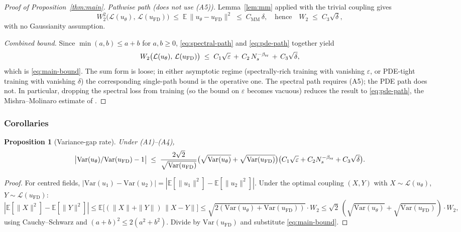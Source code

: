 \documentclass[review,12pt]{elsarticle}
\newtheorem{proposition}{Proposition}
\begin{document}
\begin{proof}[Proof of Proposition~\ref{thm:main}]
\smallskip
\emph{Pathwise path (does not use (A5)).} Lemma~\ref{lem:mm} applied
with the trivial coupling gives
\[
W_2^2\bigl(\mathcal L(u_\theta),\,\mathcal L(u_{\mathrm{FD}})\bigr)
\;\le\; \mathbb E\,\|u_\theta - u_{\mathrm{FD}}\|^2
\;\le\; C_{\mathrm{MM}}\,\delta,
\quad\text{hence}\quad
W_2 \;\le\; C_3\sqrt\delta,
\tag{$\dagger$}\label{eq:pde-path}
\]
with no Gaussianity assumption.

\smallskip
\emph{Combined bound.} Since \(\min(a,b) \le a + b\) for
\(a,b\ge 0\), \eqref{eq:spectral-path} and \eqref{eq:pde-path} together
yield
\[
W_2\bigl(\mathcal L(u_\theta),\,\mathcal L(u_{\mathrm{FD}})\bigr)
\;\le\; C_1\sqrt\varepsilon \,+\, C_2\,N_s^{-\beta_{\rm sr}}
\,+\, C_3\sqrt\delta,
\]
which is \eqref{eq:main-bound}. The sum form is loose; in either
asymptotic regime (spectrally-rich training with vanishing
\(\varepsilon\), or PDE-tight training with vanishing \(\delta\))
the corresponding single-path bound is the operative one. The
spectral path requires (A5); the PDE path does not. In particular,
dropping the spectral loss from training (so the bound on
\(\varepsilon\) becomes vacuous) reduces the result to
\eqref{eq:pde-path}, the Mishra--Molinaro estimate of
\cite{MishraMolinaro2022}.
\end{proof}

\subsubsection{Corollaries}

\begin{proposition}[Variance-gap rate]
\label{cor:vr}
Under (A1)--(A4),
\[
\bigl|\mathrm{Var}(u_\theta)/\mathrm{Var}(u_{\mathrm{FD}}) - 1\bigr|
\;\le\;
\frac{2\sqrt{2}}{\sqrt{\mathrm{Var}(u_{\mathrm{FD}})}}
\bigl(\sqrt{\mathrm{Var}(u_\theta)}
+ \sqrt{\mathrm{Var}(u_{\mathrm{FD}})}\bigr)
\bigl(C_1\sqrt\varepsilon + C_2 N_s^{-\beta_{\rm sr}}
+ C_3\sqrt\delta\bigr).
\]
\end{proposition}
\begin{proof}
For centred fields, \(|\mathrm{Var}(u_1) - \mathrm{Var}(u_2)|
= |\mathbb E[\|u_1\|^2] - \mathbb E[\|u_2\|^2]|\).
Under the optimal coupling \((X, Y)\) with \(X \sim \mathcal L(u_\theta)\),
\(Y \sim \mathcal L(u_{\mathrm{FD}})\):
\[
|\mathbb E[\|X\|^2] - \mathbb E[\|Y\|^2]|
\le \mathbb E\bigl[({\|X\|+\|Y\|})\,\|X-Y\|\bigr]
\le \sqrt{2(\mathrm{Var}(u_\theta)+\mathrm{Var}(u_{\mathrm{FD}}))}
\cdot W_2
\le \sqrt{2}\,(\sqrt{\mathrm{Var}(u_\theta)}
+\sqrt{\mathrm{Var}(u_{\mathrm{FD}})})\cdot W_2,
\]
using Cauchy--Schwarz and \((a+b)^2\le 2(a^2+b^2)\).
Divide by \(\mathrm{Var}(u_{\mathrm{FD}})\) and substitute
\eqref{eq:main-bound}.
\end{proof}
\end{document}
